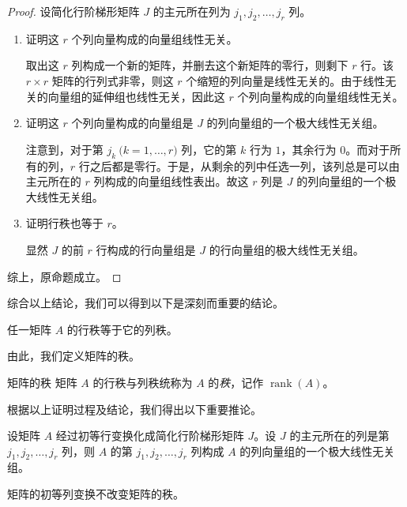 \begin{proof}
	设简化行阶梯形矩阵 $J$ 的主元所在列为 $j_1, j_2, \ldots, j_r$ 列。

	\begin{enumerate}
		\item 证明这 $r$ 个列向量构成的向量组线性无关。

		取出这 $r$ 列构成一个新的矩阵，并删去这个新矩阵的零行，则剩下 $r$ 行。该 $r \times r$ 矩阵的行列式非零，则这 $r$ 个缩短的列向量是线性无关的。由于线性无关的向量组的延伸组也线性无关，因此这 $r$ 个列向量构成的向量组线性无关。

		\item 证明这 $r$ 个列向量构成的向量组是 $J$ 的列向量组的一个极大线性无关组。

		注意到，对于第 $j_k \pod{k = 1, \ldots, r}$ 列，它的第 $k$ 行为 $1$，其余行为 $0$。而对于所有的列，$r$ 行之后都是零行。于是，从剩余的列中任选一列，该列总是可以由主元所在的 $r$ 列构成的向量组线性表出。故这 $r$ 列是 $J$ 的列向量组的一个极大线性无关组。

		\item 证明行秩也等于 $r$。

		显然 $J$ 的前 $r$ 行构成的行向量组是 $J$ 的行向量组的极大线性无关组。
	\end{enumerate}

	综上，原命题成立。
\end{proof}

综合以上结论，我们可以得到以下是深刻而重要的结论。

\begin{theorem}
	任一矩阵 $A$ 的行秩等于它的列秩。
\end{theorem}

由此，我们定义矩阵的秩。

\begin{definition}{矩阵的秩}
	矩阵 $A$ 的行秩与列秩统称为 $A$ 的\emph{秩}，记作 $\operatorname{rank}(A)$。
\end{definition}

根据以上证明过程及结论，我们得出以下重要推论。

\begin{theorem}
	设矩阵 $A$ 经过初等行变换化成简化行阶梯形矩阵 $J$。设 $J$ 的主元所在的列是第 $j_1, j_2, \ldots, j_r$ 列，则 $A$ 的第 $j_1, j_2, \ldots, j_r$ 列构成 $A$ 的列向量组的一个极大线性无关组。
\end{theorem}

\begin{theorem}
	矩阵的初等列变换不改变矩阵的秩。
\end{theorem}

